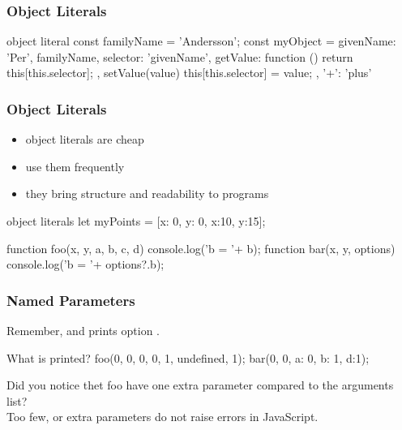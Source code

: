 \begin{frame}[fragile] \frametitle{Object Literals}
\begin{CodeBox}{object literal}
const familyName = 'Andersson';
const myObject = {
  givenName: 'Per',
  familyName,
  selector: 'givenName',
  getValue: function () {
    return this[this.selector];
  },
  setValue(value) {
    this[this.selector] = value;
  },
  '+': 'plus'
 }
\end{CodeBox}
\end{frame}

\begin{frame}[fragile] \frametitle{Object Literals}
\begin{itemize}
  \item object literals are cheap
  \item use them frequently
  \item they bring structure and readability to programs
\end{itemize}
\begin{CodeBox}{object literals}
let myPoints = [{x: 0, y: 0}, {x:10, y:15}];

function foo(x, y, a, b, c, d) {
 console.log('b = '+ b);
}
function bar(x, y, options) {
 console.log('b = '+ options?.b);
}
\end{CodeBox}
\end{frame}

\begin{frame}[fragile] \frametitle{Named Parameters}
Remember,  and  prints option .
\vspace{5mm}
\begin{CodeBox}{What is printed?}
foo(0, 0, 0, 0, 1, undefined, 1);
bar(0, 0, {a: 0, b: 1, d:1});
\end{CodeBox}
\vspace{10mm}
Did you notice thet foo have one extra parameter compared to the arguments list?
\\ Too few, or extra parameters do not raise errors in JavaScript. 
\end{frame}

